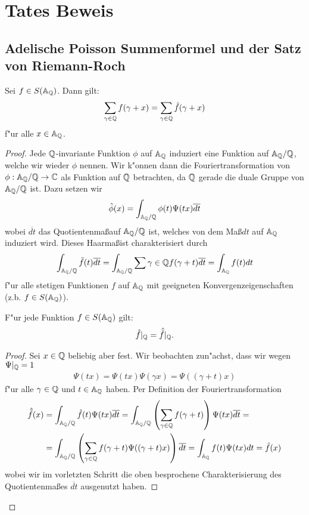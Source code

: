 \section{Tates Beweis}
\subsection{Adelische Poisson Summenformel und der Satz von Riemann-Roch}
	\begin{satz}\label{satz:adelic-poisson}
		Sei $f \in S(\mathbb{A}_{\mathbb{Q}})$. Dann gilt:
		\begin{align}
			\sum_{\gamma \in \mathbb{Q}} {f(\gamma + x)} = \sum_{\gamma \in \mathbb{Q}}{\hat{f}(\gamma + x)}
		\end{align}
		f"ur alle $x \in \mathbb{A}_{\mathbb{Q}}$.
	\end{satz}
	\begin{proof}
		Jede $\mathbb{Q}$-invariante Funktion $\phi$ auf $\mathbb{A}_{\mathbb{Q}}$ induziert eine Funktion auf $\mathbb{A}_{\mathbb{Q}}/\mathbb{Q}$, welche wir wieder $\phi$ nennen.
		Wir k"onnen dann die Fouriertransformation von $\phi: \mathbb{A}_{\mathbb{Q}}/\mathbb{Q} \rightarrow \mathbb{C}$ als Funktion auf $\mathbb{Q}$ betrachten, da $\mathbb{Q}$ gerade die duale Gruppe von $\mathbb{A}_{\mathbb{Q}}/\mathbb{Q}$ ist. Dazu setzen wir
		\begin{align*}
			\hat{\phi}(x) = \int_{\mathbb{A}_{\mathbb{Q}}/\mathbb{Q}}\phi(t)\Psi(tx)\overline{dt}
		\end{align*}
		wobei $\overline{dt}$ das Quotientenma\ss auf $\mathbb{A}_{\mathbb{Q}}/\mathbb{Q}$ ist, welches von dem Ma\ss $dt$ auf $\mathbb{A}_{\mathbb{Q}}$ induziert wird. Dieses Haarma\ss ist charakterisiert durch
		\begin{align*}
			\int_{\mathbb{A}_{\mathbb{Q}}/\mathbb{Q}}\tilde{f}(t)\overline{dt} =
			\int_{\mathbb{A}_{\mathbb{Q}}/\mathbb{Q}}\sum{\gamma \in \mathbb{Q}}f(\gamma+t)\overline{dt} =
			\int_{\mathbb{A}_{\mathbb{Q}}} f(t)dt
		\end{align*}
		f"ur alle stetigen Funktionen $f$ auf $\mathbb{A}_{\mathbb{Q}}$ mit geeigneten Konvergenzeigenschaften (z.b. $f\in S(\mathbb{A}_{\mathbb{Q}})$).
		
		\begin{lemma}
			F"ur jede Funktion $f \in S(\mathbb{A}_{\mathbb{Q}})$ gilt:
			\begin{align*}
				\hat{f}|_{\mathbb{Q}} = \hat{\tilde{f}}|_{\mathbb{Q}}.
			\end{align*}
		\end{lemma}
		\begin{proof}
			Sei $x \in \mathbb{Q}$ beliebig aber fest. Wir beobachten zun"achst, dass wir wegen $\Psi|_{\mathbb{Q}} =1$
			\begin{align*}
				\Psi(tx)= \Psi(tx)\Psi(\gamma x)=\Psi((\gamma + t) x)
			\end{align*}
			f"ur alle $\gamma \in \mathbb{Q}$ und $t\in \mathbb{A}_{\mathbb{Q}}$ haben. Per Definition der Fouriertransformation
			\begin{align*}
				\hat{\tilde{f}}(x)	&= \int_{\mathbb{A}_{\mathbb{Q}} / \mathbb{Q}} {\hat{f}(t)\Psi(tx)\overline{dt}} 
									 = \int_{\mathbb{A}_{\mathbb{Q}} / \mathbb{Q}} \left(\sum_{\gamma \in \mathbb{Q}}{f(\gamma + t)}\right)\Psi(tx)\overline{dt} =\\
									&= \int_{\mathbb{A}_{\mathbb{Q}} / \mathbb{Q}} \left(\sum_{\gamma \in \mathbb{Q}}{f(\gamma + t)}\Psi((\gamma + t)x)\right)\overline{dt}
									 = \int_{\mathbb{A}_{\mathbb{Q}}} f(t)\Psi(tx)dt = \hat{f}(x)
			\end{align*}
			wobei wir im vorletzten Schritt die oben besprochene Charakterisierung des Quotientenmaßes $\overline{dt}$ ausgenutzt haben.
		\end{proof}
		

\end{proof}
